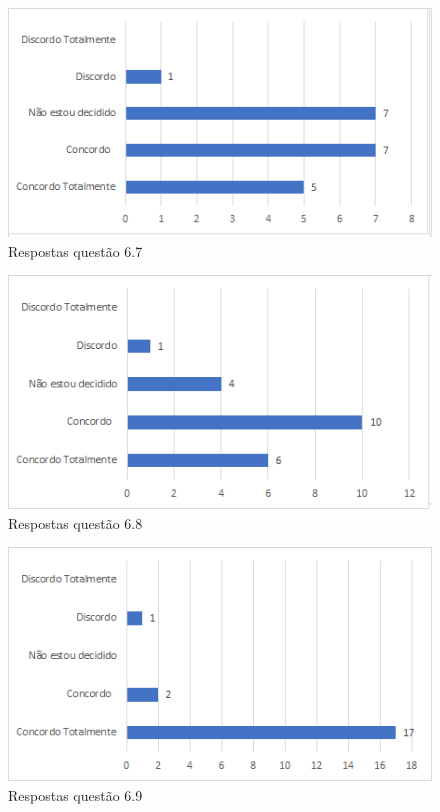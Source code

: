 \begin{figure}[!t]
\centering
\includegraphics[scale=0.7]{figuras das questoes/6.7.png}
\caption{Respostas questão 6.7}
\end{figure}

\begin{figure}[!t]
\centering
\includegraphics[scale=0.7]{figuras das questoes/6.8.png}
\caption{Respostas questão 6.8}
\end{figure}

\begin{figure}[!t]
\centering
\includegraphics[scale=0.7]{figuras das questoes/6.9.png}
\caption{Respostas questão 6.9}
\end{figure}

